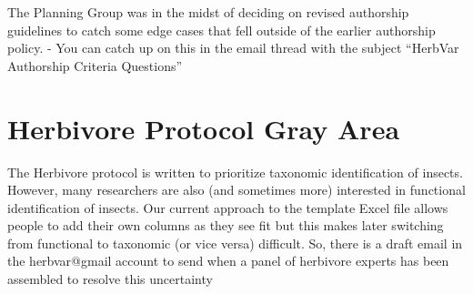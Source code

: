 \documentclass[
  letterpaper,
  oneside,
  open=any]{scrbook}
\begin{document}
The Planning Group was in the midst of deciding on revised authorship
guidelines to catch some edge cases that fell outside of the earlier
authorship policy. - You can catch up on this in the email thread with
the subject ``HerbVar Authorship Criteria Questions''

\section{Herbivore Protocol Gray
Area}\label{herbivore-protocol-gray-area}

The Herbivore protocol is written to prioritize taxonomic identification
of insects. However, many researchers are also (and sometimes more)
interested in functional identification of insects. Our current approach
to the template Excel file allows people to add their own columns as
they see fit but this makes later switching from functional to taxonomic
(or vice versa) difficult. So, there is a draft email in the
herbvar@gmail account to send when a panel of herbivore experts has been
assembled to resolve this uncertainty


\backmatter
\end{document}

